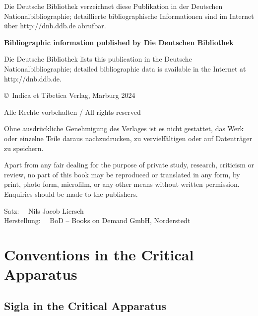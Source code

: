 \noindent
Die Deutsche Bibliothek verzeichnet diese Publikation in der Deutschen Nationalbibliographie;
detaillierte bibliographische Informationen sind im Internet über http://dnb.ddb.de abrufbar.

\noindent
\textbf{Bibliographic information published by Die Deutschen Bibliothek}

\noindent
Die Deutsche Bibliothek lists this publication in the Deutsche Nationalbibliographie; detailed
bibliographic data is available in the Internet at http://dnb.ddb.de.  


\vskip 1cm

\noindent
\copyright\ Indica et Tibetica Verlag, Marburg 2024

\medskip

\noindent
Alle Rechte vorbehalten / All rights reserved

\medskip

\noindent
Ohne ausdrückliche Genehmigung des Verlages ist es nicht gestattet, das Werk oder einzelne Teile
daraus nachzudrucken, zu vervielfältigen oder auf Datenträger zu speichern.

\smallskip

\noindent
Apart from any fair dealing for the purpose of private study, research, criticism or review, no
part of this book may be reproduced or translated in any form, by print, photo form, microfilm, or
any other means without written permission. Enquiries should be made to the publishers.

\bigskip

\noindent
Satz: \ \ Nils Jacob Liersch \\
Herstellung: \ \ BoD – Books on Demand GmbH, Norderstedt  \\

\bigskip

\noindent

\normalsize

\newpage

\clearpage
\tableofcontents
\addtocounter{page}{-1}
\thispagestyle{empty}
\clearpage


\mainmatter

\chapter{Conventions in the Critical Apparatus}
\section{Sigla in the Critical Apparatus}

